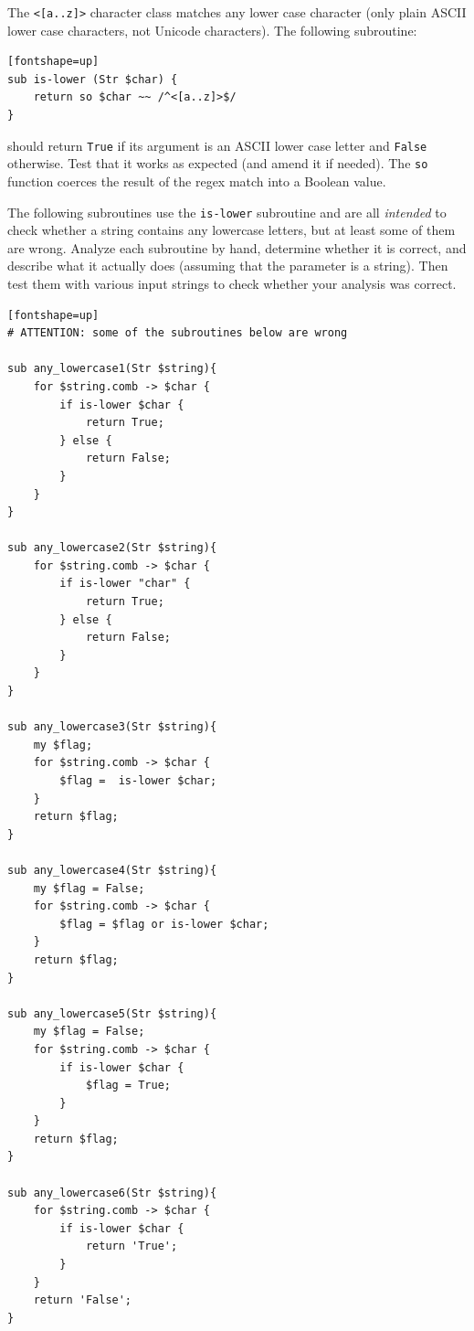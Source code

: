 \begin{exercise}

\label{islower}
The \verb'<[a..z]>' character class matches any lower case 
character (only plain ASCII lower case characters, not 
Unicode characters). The following subroutine:

\begin{verbatim}[fontshape=up]
sub is-lower (Str $char) { 
    return so $char ~~ /^<[a..z]>$/
}
\end{verbatim}

should return {\tt True} if its argument is an ASCII lower case 
letter and {\tt False} otherwise. Test that it works as 
expected (and amend it if needed). The {\tt so} function 
coerces the result of the regex match into a Boolean value.

The following subroutines use the {\tt is-lower} subroutine 
and are all {\em intended} to check 
whether a string contains any lowercase letters, but at 
least some of them are wrong.  Analyze each subroutine by hand, 
determine whether it is correct, and describe what it 
actually does (assuming that the parameter is a string). Then 
test them with various input strings to check whether your 
analysis was correct.

\begin{verbatim}[fontshape=up]
# ATTENTION: some of the subroutines below are wrong

sub any_lowercase1(Str $string){
    for $string.comb -> $char {
        if is-lower $char {
            return True;
        } else {
            return False;
        }
    }
}

sub any_lowercase2(Str $string){
    for $string.comb -> $char {
        if is-lower "char" {
            return True;
        } else {
            return False;
        }
    }
}

sub any_lowercase3(Str $string){
    my $flag;
    for $string.comb -> $char {
        $flag =  is-lower $char;
    }
    return $flag;
}

sub any_lowercase4(Str $string){
    my $flag = False;
    for $string.comb -> $char {
        $flag = $flag or is-lower $char;
    }
    return $flag;
}

sub any_lowercase5(Str $string){
    my $flag = False;
    for $string.comb -> $char {
        if is-lower $char {
            $flag = True;
        }
    }
    return $flag;
}

sub any_lowercase6(Str $string){
    for $string.comb -> $char {
        if is-lower $char {
            return 'True';
        }
    }
    return 'False';
}


\end{verbatim}
\end{exercise}
